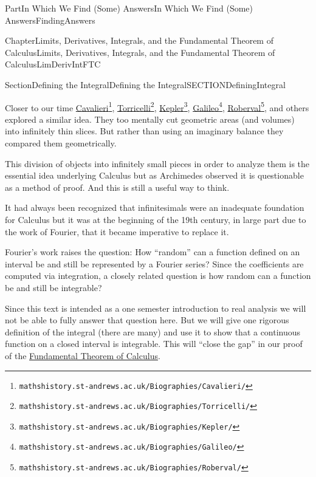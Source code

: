 \documentclass[oneside,10pt,]{book}
\numberwithin{equation}{part}
\begin{document}
\begin{partptx}{Part}{In Which We Find (Some) Answers}{}{In Which We Find (Some) Answers}{}{}{FindingAnswers}
\begin{chapterptx}{Chapter}{Limits, Derivatives, Integrals, and the Fundamental Theorem of Calculus}{}{Limits, Derivatives, Integrals, and the Fundamental Theorem of Calculus}{}{}{LimDerivIntFTC}
\begin{sectionptx}{Section}{Defining the Integral}{}{Defining the Integral}{}{}{SECTIONDefiningIntegral}
\begin{introduction}{}
Closer to our time \href{https://mathshistory.st-andrews.ac.uk/Biographies/Cavalieri/}{Cavalieri}\footnote{\nolinkurl{mathshistory.st-andrews.ac.uk/Biographies/Cavalieri/}\label{SECTIONDefiningIntegral-2-3-2}}, \href{https://mathshistory.st-andrews.ac.uk/Biographies/Torricelli/}{Torricelli}\footnote{\nolinkurl{mathshistory.st-andrews.ac.uk/Biographies/Torricelli/}\label{SECTIONDefiningIntegral-2-3-4}}, \href{https://mathshistory.st-andrews.ac.uk/Biographies/Kepler/}{Kepler}\footnote{\nolinkurl{mathshistory.st-andrews.ac.uk/Biographies/Kepler/}\label{SECTIONDefiningIntegral-2-3-6}}, \href{https://mathshistory.st-andrews.ac.uk/Biographies/Galileo/}{Galileo}\footnote{\nolinkurl{mathshistory.st-andrews.ac.uk/Biographies/Galileo/}\label{SECTIONDefiningIntegral-2-3-8}}, \href{https://mathshistory.st-andrews.ac.uk/Biographies/Roberval/}{Roberval}\footnote{\nolinkurl{mathshistory.st-andrews.ac.uk/Biographies/Roberval/}\label{SECTIONDefiningIntegral-2-3-10}}, and others explored a similar idea. They too mentally  cut geometric areas (and volumes) into infinitely thin slices.  But rather than using an imaginary balance they compared them geometrically.%
\par
This division of objects into infinitely small pieces in order to analyze them is the essential idea underlying Calculus but as Archimedes observed it is questionable as a method of proof. And this is still a useful way to think.%
\par
It had always been recognized that infinitesimals were an inadequate foundation for Calculus     but it was at the beginning of the 19th century, in large part due to the work of Fourier, that it became imperative to replace it.%
\par
Fourier's work raises the question: How ``random'' can a function defined on an interval be and still be represented by a Fourier series?  Since the coefficients are computed via integration, a closely related question is how random can a function be and still be integrable?%
\par
Since this text is intended as a one semester introduction to real analysis we will not be able to fully answer that question here. But we will give one rigorous definition of the integral (there are many) and use it to show that a continuous function on a closed interval is integrable.  This will ``close the gap'' in our proof of the \hyperref[THEOREMFTCCauchy]{Fundamental Theorem of Calculus}.      %
\end{introduction}%
%
%
\typeout{************************************************}

\end{sectionptx}
\end{chapterptx}
\end{partptx}
\end{document}
